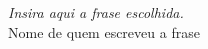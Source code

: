 \clearpage
\begin{epigrafe}
\vspace*{\fill}
\begin{flushright}
\emph{Insira aqui a frase escolhida.}\\
Nome de quem escreveu a frase
\end{flushright}
\end{epigrafe}
\clearpage
